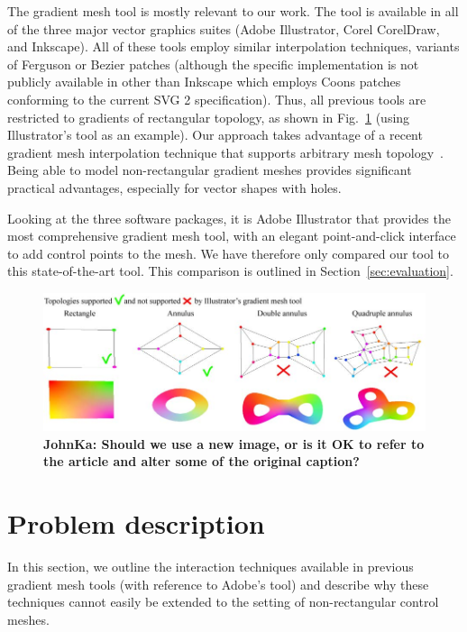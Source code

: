 \documentclass{egpubl}
\newcommand{\note}[3]{{\color{#2}\textbf{#1: #3}}}
\newcommand{\john}[1]{\note{JohnKa}{RubineRed}{#1}}
\begin{document}
The gradient mesh tool is mostly relevant to our work. The tool is available in all of the three major vector graphics suites (Adobe Illustrator, Corel CorelDraw, and Inkscape). All of these tools employ similar interpolation techniques, variants of Ferguson or Bezier patches (although the specific implementation is not publicly available in other than Inkscape which employs Coons patches conforming to the current SVG 2 specification). Thus, all previous tools are restricted to gradients of rectangular topology, as shown in Fig.~\ref{fig:IllustratorVsOur} (using Illustrator's tool as an example). Our approach takes advantage of a recent gradient mesh interpolation technique that supports arbitrary mesh topology~\cite{Lieng:2016}. Being able to model non-rectangular gradient meshes provides significant practical advantages, especially for vector shapes with holes.

Looking at the three software packages, it is Adobe Illustrator that provides the most comprehensive gradient mesh tool, with an elegant point-and-click interface to add control points to the mesh. We have therefore only compared our tool to this state-of-the-art tool. This comparison is outlined in Section~\ref{sec:evaluation}.

\begin{figure}
\includegraphics[]{illustratorVsOur.jpg}
\caption{\john{Should we use a new image, or is it OK to refer to the article and alter some of the original caption?}}
\label{fig:IllustratorVsOur}
\end{figure}

\section{Problem description}
\label{sec:overview}

In this section, we outline the interaction techniques available in previous gradient mesh tools (with reference to Adobe's tool) and describe why these techniques cannot easily be extended to the setting of non-rectangular control meshes.
\end{document}
